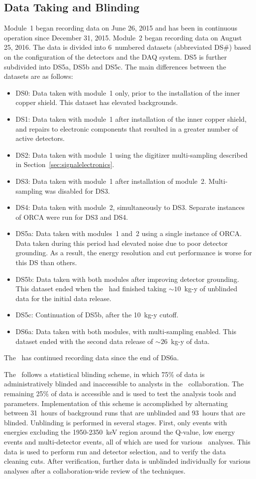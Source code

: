 \documentclass[/main.tex]{subfiles}
\begin{document}
\subsection{Data Taking and Blinding}
Module~1 began recording data on June 26, 2015 and has been in continuous operation since December 31, 2015.
Module~2 began recording data on August 25, 2016.
The data is divided into 6~numbered datasets (abbreviated DS\#) based on the configuration of the detectors and the DAQ system.
DS5 is further subdivided into DS5a, DS5b and DS5c.
The main differences between the datasets are as follows:
\begin{itemize}
\item DS0: Data taken with module~1 only, prior to the installation of the inner copper shield. This dataset has elevated backgrounds.
\item DS1: Data taken with module~1 after installation of the inner copper shield, and repairs to electronic components that resulted in a greater number of active detectors.
\item DS2: Data taken with module~1 using the digitizer multi-sampling described in Section~\ref{sec:signalelectronics}.
\item DS3: Data taken with module~1 after installation of module~2. Multi-sampling was disabled for DS3.
\item DS4: Data taken with module~2, simultaneously to DS3. Separate instances of ORCA were run for DS3 and DS4.
\item DS5a: Data taken with modules~1 and~2 using a single instance of ORCA. Data taken during this period had elevated noise due to poor detector grounding. As a result, the energy resolution and cut performance is worse for this DS than others.
\item DS5b: Data taken with both modules after improving detector grounding. This dataset ended when the \MJD\ had finished taking $\sim10$~kg-y of unblinded data for the initial data release.
\item DS5c: Continuation of DS5b, after the 10~kg-y cutoff.
\item DS6a: Data taken with both modules, with multi-sampling enabled. This dataset ended with the second data release of $\sim26$~kg-y of data.
\end{itemize}
The \MJD\ has continued recording data since the end of DS6a.

The \MJD\ follows a statistical blinding scheme, in which 75\% of data is administratively blinded and inaccessible to analysts in the \MJ\ collaboration.
The remaining 25\% of data is accessible and is used to test the analysis tools and parameters.
Implementation of this scheme is accomplished by alternating between 31~hours of background runs that are unblinded and 93~hours that are blinded.
Unblinding is performed in several stages.
First, only events with energies excluding the 1950-2350~keV region around the Q-value, low energy events and multi-detector events, all of which are used for various \MJD\ analyses.
This data is used to perform run and detector selection, and to verify the data cleaning cuts.
After verification, further data is unblinded individually for various analyses after a collaboration-wide review of the techniques.
\end{document}
